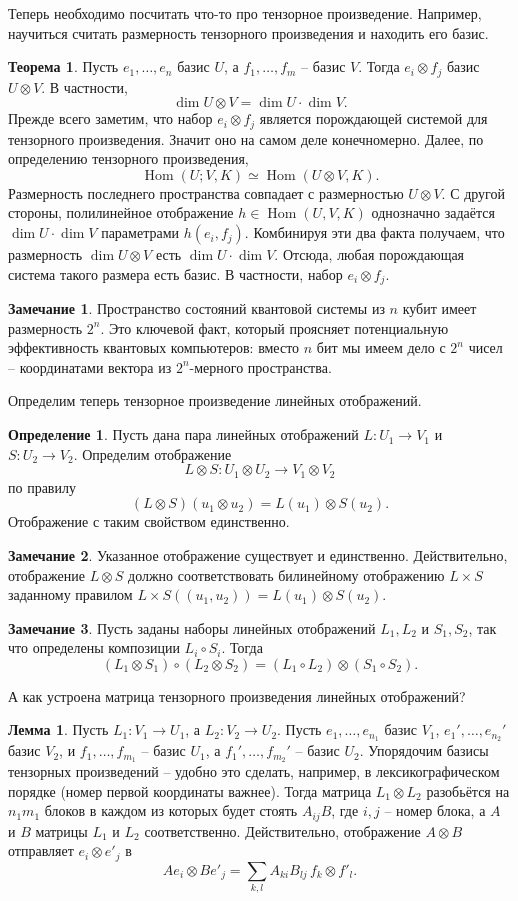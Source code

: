 \documentclass[10pt,a4paper,oneside]{book}
\theoremstyle{definition}
\newtheorem*{rem}{\color{green!50!blue}Замечание}
\newtheorem*{defn}{\color{yellow!30!red} Определение}
\newtheorem{thm}{\color{red!40!black}Теорема}
\newtheorem{lem}{\color{green!50!black}Лемма}
\newcommand{\Hom}{\operatorname{Hom}}
\def\thrm{\begin{thm}}
\def\ethrm{\end{thm}}
\def\dfn{\begin{defn}}
\def\edfn{\end{defn}}
\def\lm{\begin{lem}}
\def\elm{\end{lem}}
\def\rm{\begin{rem}}
\def\erm{\end{rem}}
\begin{document}
Теперь необходимо посчитать что-то про тензорное произведение. Например, научиться считать размерность тензорного произведения и находить его базис.
\thrm Пусть $e_1,\dots,e_n$ базис $U$, а $f_1,\dots,f_m$ -- базис $V$. Тогда $e_i\otimes f_j$ базис $U \otimes V$. В частности, 
$$\dim U \otimes V= \dim U \cdot \dim V.$$ 
\proof Прежде всего заметим, что набор $e_i \otimes f_j$ является порождающей системой для тензорного произведения. Значит оно на самом деле конечномерно. Далее, по определению тензорного произведения,
$$\Hom(U;V, K) \simeq \Hom(U\otimes  V,K).$$
Размерность последнего пространства совпадает с размерностью $U\otimes V$. С другой стороны, полилинейное отображение $h \in \Hom(U,V, K)$ однозначно задаётся $\dim U \cdot \dim V$  параметрами $h(e_i,f_j)$. Комбинируя эти два факта получаем, что размерность $\dim U \otimes V$ есть $\dim U \cdot \dim V$. Отсюда, любая порождающая система такого размера есть базис. В частности, набор $e_i \otimes f_j$.
\endproof
\ethrm


\rm Пространство состояний квантовой системы из $n$ кубит имеет размерность $2^n$. Это ключевой факт, который проясняет потенциальную эффективность квантовых компьютеров: вместо $n$ бит мы имеем дело с $2^n$ чисел -- координатами вектора из $2^n$-мерного пространства.
\erm


Определим теперь тензорное произведение линейных отображений.

\dfn Пусть дана пара линейных отображений $L \colon U_1 \to V_1$ и $S\colon U_2 \to V_2 $. Определим отображение $$L\otimes S \colon U_1\otimes U_2 \to V_1\otimes V_2$$ по  правилу $$(L \otimes S) (u_1\otimes  u_2) = L(u_1)\otimes S(u_2).$$
Отображение с таким свойством единственно.
\edfn

\rm Указанное отображение существует и единственно. Действительно,  отображение $L\otimes S$ должно соответствовать билинейному отображению $L\times S$ заданному правилом $L\times S ((u_1,u_2)) = L(u_1)\otimes S(u_2)$. 
\erm

\rm Пусть заданы наборы линейных отображений $L_1, L_2$ и $S_1, S_2$, так что определены композиции $L_i\circ S_i$. Тогда
$$(L_1\otimes S_1) \circ (L_2 \otimes S_2)=(L_1\circ L_2)\otimes (S_1\circ S_2).$$
\erm 

А как устроена матрица тензорного произведения линейных отображений?


\lm Пусть $L_1 \colon V_1 \to U_1$, а $L_2 \colon V_2 \to U_2$. Пусть $e_1,\dots, e_{n_1}$ базис $V_1$,  $e_1',\dots, e_{n_2}'$ базис $V_2$,  и $f_1,\dots, f_{m_1}$ -- базис $U_1$, а $f_1',\dots, f_{m_2}'$ -- базис $U_2$. 
Упорядочим базисы тензорных произведений -- удобно это сделать, например, в лексикографическом порядке (номер первой координаты важнее).
Тогда матрица  $L_1\otimes L_2$  разобьётся на $n_1m_1$ блоков в каждом из которых будет стоять $ A_{ij} B$, где $i,j$ -- номер блока, а $A$ и $B$ матрицы $L_1$ и $L_2$ соответственно.
\proof Действительно, отображение $A\otimes B$ отправляет $e_i\otimes e'_j$ в 
$$Ae_i \otimes Be'_j = \sum_{k,l} A_{ki}B_{lj} \, f_k\otimes f'_l.$$
\endproof
\elm
\end{document}
